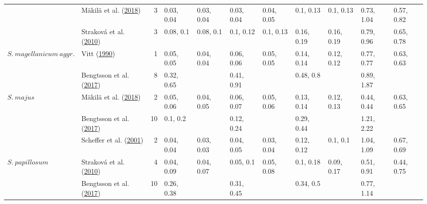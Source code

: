 \documentclass[
  12pt,
]{article}
\begin{document}
\begin{table}[H]
{\begin{tabular}[t]{llrllllllll}
 & Mäkilä et al. (\protect\hyperlink{ref-Makila.2018}{2018}) & 3 & 0.03, 0.04 & 0.03, 0.04 & 0.03, 0.04 & 0.04, 0.05 & 0.1, 0.13 & 0.1, 0.13 & 0.73, 1.04 & 0.57, 0.82\\

 & Straková et al. (\protect\hyperlink{ref-Strakova.2010}{2010}) & 3 & 0.08, 0.1 & 0.08, 0.1 & 0.1, 0.12 & 0.1, 0.13 & 0.16, 0.19 & 0.16, 0.19 & 0.79, 0.96 & 0.65, 0.78\\

\multirow[t]{-4}{*}{\raggedright\arraybackslash $S.~magellanicum~aggr.$} & Vitt (\protect\hyperlink{ref-Vitt.1990}{1990}) & 1 & 0.05, 0.05 & 0.04, 0.04 & 0.06, 0.06 & 0.05, 0.05 & 0.14, 0.14 & 0.12, 0.12 & 0.77, 0.77 & 0.63, 0.63\\
\cmidrule{1-11}
 & Bengtsson et al. (\protect\hyperlink{ref-Bengtsson.2017}{2017}) & 8 & 0.32, 0.65 &  & 0.41, 0.91 &  & 0.48, 0.8 &  & 0.89, 1.87 & \\

\multirow[t]{-2}{*}{\raggedright\arraybackslash $S.~majus$} & Mäkilä et al. (\protect\hyperlink{ref-Makila.2018}{2018}) & 2 & 0.05, 0.06 & 0.04, 0.05 & 0.06, 0.07 & 0.05, 0.06 & 0.13, 0.14 & 0.12, 0.13 & 0.44, 0.44 & 0.63, 0.65\\
\cmidrule{1-11}
 & Bengtsson et al. (\protect\hyperlink{ref-Bengtsson.2017}{2017}) & 10 & 0.1, 0.2 &  & 0.12, 0.24 &  & 0.29, 0.44 &  & 1.21, 2.22 & \\

 & Scheffer et al. (\protect\hyperlink{ref-Scheffer.2001}{2001}) & 2 & 0.04, 0.04 & 0.03, 0.03 & 0.04, 0.05 & 0.03, 0.04 & 0.12, 0.12 & 0.1, 0.1 & 1.04, 1.09 & 0.67, 0.69\\

\multirow[t]{-3}{*}{\raggedright\arraybackslash $S.~papillosum$} & Straková et al. (\protect\hyperlink{ref-Strakova.2010}{2010}) & 4 & 0.04, 0.09 & 0.04, 0.07 & 0.05, 0.1 & 0.05, 0.08 & 0.1, 0.18 & 0.09, 0.17 & 0.51, 0.91 & 0.44, 0.75\\
\cmidrule{1-11}
 & Bengtsson et al. (\protect\hyperlink{ref-Bengtsson.2017}{2017}) & 10 & 0.26, 0.38 &  & 0.31, 0.45 &  & 0.34, 0.5 &  & 0.77, 1.14 & \\


\end{tabular}}
\end{table}
\end{document}
